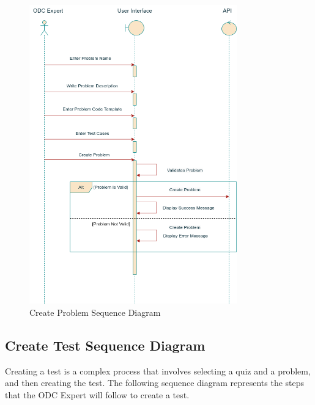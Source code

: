 \begin{figure}[h!]
  \centering
  \includegraphics[width=0.8\textwidth, height=0.8\textheight]{images/seq_createProblem.png}
  \caption{Create Problem Sequence Diagram}\label{Create Problem Sequence Diagram}
\end{figure}

\subsection{Create Test Sequence Diagram}
Creating a test is a complex process that involves selecting a quiz and a problem, and then creating the test.
The following sequence diagram represents the steps that the ODC Expert will follow to create a test.

